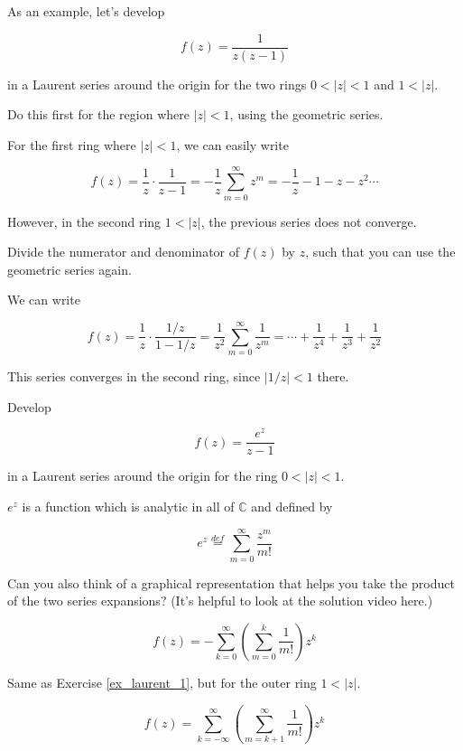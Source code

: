 As an example, let's develop

$$f(z)=\frac{1}{z(z-1)}$$

in a Laurent series around the origin for the two rings $0 < | z | < 1$ and $ 1 < |z|$.

\begin{cue}
Do this first for the region where  $| z | < 1$, using the geometric series.
\end{cue}

For the first ring where $| z | < 1$, we can easily write

$$f(z)=\frac{1}{z} \cdot \frac{1}{z-1} = -\frac{1}{z} \sum_{m=0}^{\infty} z^m =-\frac{1}{z}-1-z-z^2 \cdots$$

However, in the second ring  $ 1 < |z|$, the previous series does not converge.

\begin{cue}
Divide the numerator and denominator of $f(z)$ by $z$, such that you can use the geometric series again.
\end{cue}

We can write

$$f(z)=\frac{1}{z} \cdot \frac{1 / z }{1-1/z} = \frac{1}{z^2} \sum_{m=0}^{\infty} \frac{1}{z^m} =\cdots+\frac{1}{z^4}+\frac{1}{z^3} + \frac{1}{z^2}$$

This series converges in the second ring, since $|1/z| < 1$ there.

\pagebreak

\begin{exer}
\label{ex_laurent_1}
Develop

$$f(z)=\frac{e^z}{z-1}$$

in a Laurent series around the origin for the ring $0 < | z | < 1$.

$e^z$ is a function which is analytic in all of $\mathbb{C}$ and defined by

$$e^z \stackrel{def}{=} \sum_{m=0}^{\infty} \frac{z^m}{m!} $$

Can you also think of a graphical representation that helps you take the product of the two series expansions? (It's helpful to look at the solution video here.)

\begin{sol}
$$f(z)= - \sum_{k=0}^{\infty} \left(\sum _{m=0}^k \frac{1}{m!} \right) z^k $$
\end{sol}

\end{exer}

\begin{exer}
  Same as Exercise \ref{ex_laurent_1}, but for the outer ring  $1 < | z |$.

\begin{sol}
$$f(z)=  \sum_{k=-\infty}^{\infty} \left(\sum_{m=k+1}^\infty \frac{1}{m!} \right) z^k $$
\end{sol}
  
\end{exer}

